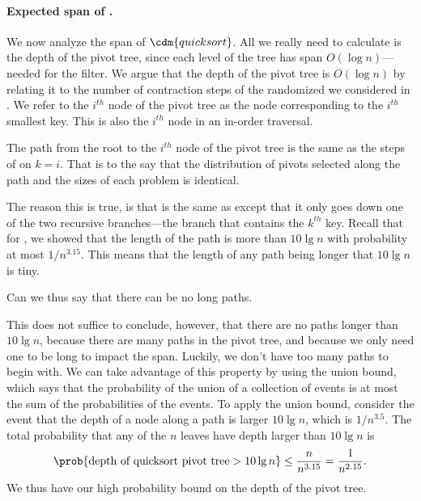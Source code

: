 {\paragraph{Expected span of \Qsort{}.}
We now analyze the span of $\cdm{\qsort{}}$.  All we really need to
calculate is the depth of the pivot tree, since each level of the tree
has span $O(\log n)$---needed for the filter.  We argue that the depth
of the pivot tree is $O(\log n)$ by relating it to the number of
contraction steps of the randomized  we considered
in .  
%
We refer to the $i^{th}$ node of
the pivot tree as the node corresponding to the $i^{th}$ smallest key.
This is also the $i^{th}$ node in an in-order traversal.

\begin{claim}
The path from the root to the $i^{th}$ node of the pivot tree is the
same as the steps of  on $k = i$.  That is to the
say that the distribution of pivots selected along the path and the
sizes of each problem is identical.
\end{claim}

The reason this is true, is that  is the same as
 except that it only goes down one of the two recursive
branches---the branch that contains the $k^{th}$ key.
%
Recall that for , we showed that the length of the
path is more than $10 \lg n$ with probability at most $1/n^{3.15}$.
%
This means that the length of any path being longer that $10\lg{n}$ is
tiny.
%
\begin{question}
Can we thus say that there can be no long paths.
\end{question}
This does not suffice to conclude, however, that there are no paths
longer than $10\lg{n}$, because there are many paths in the pivot
tree, and because we only need one to be long to impact the span.
%
Luckily, we don't have too many paths to begin with.
%
We can take advantage of this property by using the union bound,
%
which
%
says that the probability of the union of a collection of events is at
most the sum of the probabilities of the events.
%
To apply the union bound, consider the event that the depth of a node
along a path is larger $10 \lg n$, which is $1/n^{3.5}$.
%
The total probability that any of the $n$ leaves have depth larger
than $10 \lg n$ is
\[
\prob{\mbox{depth of \qsort{} pivot tree} > 10 \lg n} 
\leq 
\frac{n}{n^{3.15}} = \frac{1}{n^{2.15}}.
\]
%
We thus have our high probability bound on the depth of the pivot tree.

}
